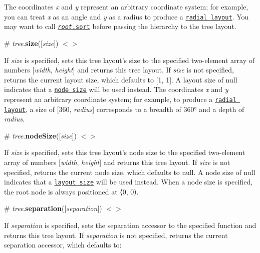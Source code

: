 The coordinates {\itshape x} and {\itshape y} represent an arbitrary coordinate system; for example, you can treat {\itshape x} as an angle and {\itshape y} as a radius to produce a \href{http://bl.ocks.org/mbostock/2e12b0bd732e7fe4000e2d11ecab0268}{\tt radial layout}. You may want to call \href{#node_sort}{\tt {\itshape root}.sort} before passing the hierarchy to the tree layout.

\label{_tree_size}%
\# {\itshape tree}.{\bfseries size}(\mbox{[}{\itshape size}\mbox{]}) \href{https://github.com/d3/d3-hierarchy/blob/master/src/tree.js#L228}{\tt $<$$>$}

If {\itshape size} is specified, sets this tree layout’s size to the specified two-\/element array of numbers \mbox{[}{\itshape width}, {\itshape height}\mbox{]} and returns this tree layout. If {\itshape size} is not specified, returns the current layout size, which defaults to \mbox{[}1, 1\mbox{]}. A layout size of null indicates that a \href{#node_size}{\tt node size} will be used instead. The coordinates {\itshape x} and {\itshape y} represent an arbitrary coordinate system; for example, to produce a \href{http://bl.ocks.org/mbostock/2e12b0bd732e7fe4000e2d11ecab0268}{\tt radial layout}, a size of \mbox{[}360, {\itshape radius}\mbox{]} corresponds to a breadth of 360° and a depth of {\itshape radius}.

\label{_tree_nodeSize}%
\# {\itshape tree}.{\bfseries node\+Size}(\mbox{[}{\itshape size}\mbox{]}) \href{https://github.com/d3/d3-hierarchy/blob/master/src/tree.js#L232}{\tt $<$$>$}

If {\itshape size} is specified, sets this tree layout’s node size to the specified two-\/element array of numbers \mbox{[}{\itshape width}, {\itshape height}\mbox{]} and returns this tree layout. If {\itshape size} is not specified, returns the current node size, which defaults to null. A node size of null indicates that a \href{#tree_size}{\tt layout size} will be used instead. When a node size is specified, the root node is always positioned at ⟨0, 0⟩.

\label{_tree_separation}%
\# {\itshape tree}.{\bfseries separation}(\mbox{[}{\itshape separation}\mbox{]}) \href{https://github.com/d3/d3-hierarchy/blob/master/src/tree.js#L224}{\tt $<$$>$}

If {\itshape separation} is specified, sets the separation accessor to the specified function and returns this tree layout. If {\itshape separation} is not specified, returns the current separation accessor, which defaults to\+:


